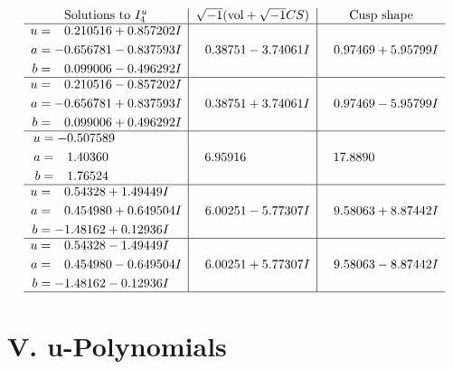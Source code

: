\documentclass[1p]{elsarticle_modified}
\theoremstyle{definition}
\newcommand{\I}{\sqrt{-1}}
\begin{document}
$$\begin{array}{c|c|c}  
\text{Solutions to }I^u_{4}& \I (\text{vol} + \sqrt{-1}CS) & \text{Cusp shape}\\
 \hline 
\begin{aligned}
u &= \phantom{-}0.210516 + 0.857202 I \\
a &= -0.656781 - 0.837593 I \\
b &= \phantom{-}0.099006 - 0.496292 I\end{aligned}
 & \phantom{-}0.38751 - 3.74061 I & \phantom{-}0.97469 + 5.95799 I \\ \hline\begin{aligned}
u &= \phantom{-}0.210516 - 0.857202 I \\
a &= -0.656781 + 0.837593 I \\
b &= \phantom{-}0.099006 + 0.496292 I\end{aligned}
 & \phantom{-}0.38751 + 3.74061 I & \phantom{-}0.97469 - 5.95799 I \\ \hline\begin{aligned}
u &= -0.507589\phantom{ +0.000000I} \\
a &= \phantom{-}1.40360\phantom{ +0.000000I} \\
b &= \phantom{-}1.76524\phantom{ +0.000000I}\end{aligned}
 & \phantom{-}6.95916\phantom{ +0.000000I} & \phantom{-}17.8890\phantom{ +0.000000I} \\ \hline\begin{aligned}
u &= \phantom{-}0.54328 + 1.49449 I \\
a &= \phantom{-}0.454980 + 0.649504 I \\
b &= -1.48162 + 0.12936 I\end{aligned}
 & \phantom{-}6.00251 - 5.77307 I & \phantom{-}9.58063 + 8.87442 I \\ \hline\begin{aligned}
u &= \phantom{-}0.54328 - 1.49449 I \\
a &= \phantom{-}0.454980 - 0.649504 I \\
b &= -1.48162 - 0.12936 I\end{aligned}
 & \phantom{-}6.00251 + 5.77307 I & \phantom{-}9.58063 - 8.87442 I\\
 \hline 
 \end{array}$$\newpage
\newpage\renewcommand{\arraystretch}{1}
\centering \section*{ V. u-Polynomials}
\end{document}
